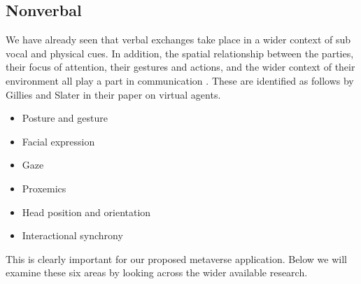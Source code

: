 \subsection{Nonverbal}
We have already seen that verbal exchanges take place in a wider context of sub vocal and physical cues. In addition, the spatial relationship between the parties, their focus of attention, their gestures and actions, and the wider context of their environment all play a part in communication \cite{Goodwin2000}. These are identified as follows by Gillies and Slater \cite{Gillies2005} in their paper on virtual agents.\par
\begin{itemize}
\item Posture and gesture
\item Facial expression
\item Gaze
\item Proxemics
\item Head position and orientation
\item Interactional synchrony
\end{itemize}

This is clearly important for our proposed metaverse application. Below we will examine these six areas by looking across the wider available research.

